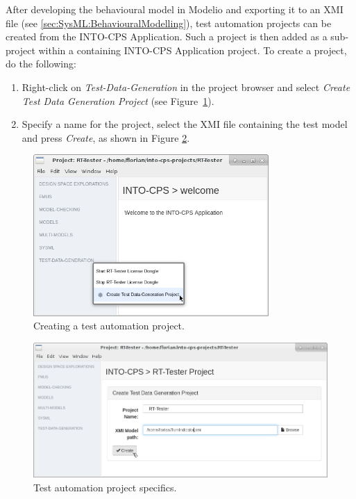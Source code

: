 After developing the behavioural model in Modelio and
exporting it to an XMI file (see \cref{sec:SysML:BehaviouralModelling}), test automation projects can
be created from the INTO-CPS Application.
Such a project is then added as a sub-project within a containing
INTO-CPS Application project.
%
To create a project, do the following:
%
%
%
\begin{enumerate}
\item  Right-click on \emph{Test-Data-Generation}
in the project browser and select \emph{Create Test Data Generation Project} (see Figure~\ref{figure:INTO-CPS-App:Create-TDG-Project}).
%
\item  Specify a name for the project, select the XMI file containing the test model and press \emph{Create}, as shown in Figure \ref{figure:INTO-CPS-App:Create-TDG-Project-Dialog}.
\end{enumerate}
%
%
%
\begin{figure}[ht]
    \centerline{\includegraphics[width=0.8\textwidth]{figures/VSI-TDG_Create-TDG-Project}}
    \caption{Creating a test automation project.}
    \label{figure:INTO-CPS-App:Create-TDG-Project}
\end{figure}
%
%
%
\begin{figure}[ht]
    \centerline{\includegraphics[width=\textwidth]{figures/VSI-TDG_Create-TDG-Project-Dialog}}
    \caption{Test automation project specifics.}
    \label{figure:INTO-CPS-App:Create-TDG-Project-Dialog}
\end{figure}
